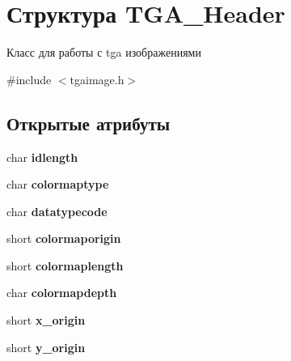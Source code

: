 \hypertarget{structTGA__Header}{}\section{Структура T\+G\+A\+\_\+\+Header}
\label{structTGA__Header}


Класс для работы с tga изображениями  




{\ttfamily \#include $<$tgaimage.\+h$>$}

\subsection*{Открытые атрибуты}
\begin{DoxyCompactItemize}
\item 
\mbox{\label{structTGA__Header_ac4003837b6b707a8031c746c3e62f627}} 
char {\bfseries idlength}
\item 
\mbox{\label{structTGA__Header_adfccd6c7d1d8ada73140bdefbc506776}} 
char {\bfseries colormaptype}
\item 
\mbox{\label{structTGA__Header_aa64f12674dba475cee154227432684b8}} 
char {\bfseries datatypecode}
\item 
\mbox{\label{structTGA__Header_a1c30612d95745ba27e5928017d1d6886}} 
short {\bfseries colormaporigin}
\item 
\mbox{\label{structTGA__Header_a7137006ba3854622467981ce8549f2e7}} 
short {\bfseries colormaplength}
\item 
\mbox{\label{structTGA__Header_a504ea170aab0d5e2efa2ea08e9b90567}} 
char {\bfseries colormapdepth}
\item 
\mbox{\label{structTGA__Header_ab5e0065fdc7edd644f63daa11e9e46b1}} 
short {\bfseries x\+\_\+origin}
\item 
\mbox{\label{structTGA__Header_a6e06588ac5b5a439e9f1b3ad37af2ef6}} 
short {\bfseries y\+\_\+origin}
\item 
\mbox{\label{structTGA__Header_a67fef802fc63fb14fb8fb7fad94b48be}} 

\end{DoxyCompactItemize}

